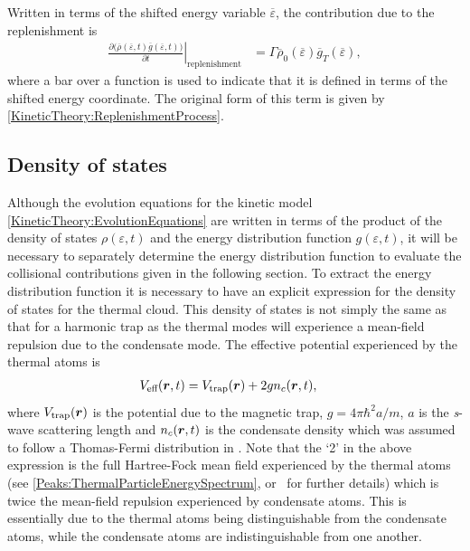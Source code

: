 Written in terms of the shifted energy variable $\overline{\varepsilon}$, the contribution due to the replenishment is
\begin{align}
    \left. \frac{\partial\big(\overline{\rho}(\overline{\varepsilon}, t) \overline{g}(\overline{\varepsilon}, t)\big)}{\partial t}\right|_\text{replenishment} &= \Gamma \overline{\rho}_0(\overline{\varepsilon}) \overline{g}_T(\overline{\varepsilon}),
    \label{MethodsAppendix:KineticTheory:ReplenishmentProcess}
\end{align}
where a bar over a function is used to indicate that it is defined in terms of the shifted energy coordinate.  The original form of this term is given by \eqref{KineticTheory:ReplenishmentProcess}.

\subsection{Density of states}
\label{MethodsAppendix:QKTDensityOfStates}

Although the evolution equations for the kinetic model \eqref{KineticTheory:EvolutionEquations} are written in terms of the product of the density of states $\rho(\varepsilon, t)$ and the energy distribution function $g(\varepsilon, t)$, it will be necessary to separately determine the energy distribution function to evaluate the collisional contributions given in the following section. To extract the energy distribution function it is necessary to have an explicit expression for the density of states for the thermal cloud. This density of states is not simply the same as that for a harmonic trap as the thermal modes will experience a mean-field repulsion due to the condensate mode. The effective potential experienced by the thermal atoms is
\begin{align}
    V_\text{eff}(\vect{r}, t) &= V_\text{trap}(\vect{r}) + 2 g n_c(\vect{r}, t), \label{MethodsAppendix:QKTEffectivePotential}
\end{align}
where $V_\text{trap}(\bm{r})$ is the potential due to the magnetic trap, $g = 4\pi \hbar^2 a/m$, $a$ is the \emph{s}-wave scattering length and $n_c(\bm{r}, t)$ is the condensate density which was assumed to follow a Thomas-Fermi distribution in .  Note that the `2' in the above expression is the full Hartree-Fock mean field experienced by the thermal atoms (see \eqref{Peaks:ThermalParticleEnergySpectrum}, or~\citep[Chapter 8]{PethickSmith} for further details) which is twice the mean-field repulsion experienced by condensate atoms.  This is essentially due to the thermal atoms being distinguishable from the condensate atoms, while the condensate atoms are indistinguishable from one another.

